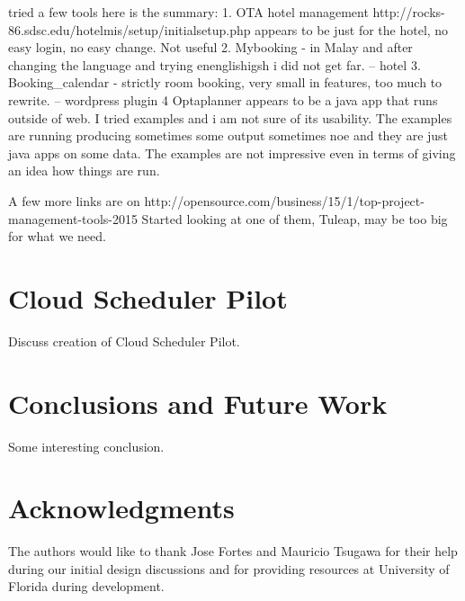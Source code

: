 \documentclass{acm_proc_article-sp}
\begin{document}
		
 tried a few tools  here is the summary:
1. OTA hotel management   http://rocks-86.sdsc.edu/hotelmis/setup/initialsetup.php
    appears to be just for the hotel, no easy login, no easy change. Not useful
2. Mybooking - in Malay and after changing the language and trying enenglishigsh i did not get far. -- hotel
3. Booking\_calendar - strictly room booking, very small in features, too much to rewrite. -- wordpress plugin
4 Optaplanner appears to be a java app that runs outside of web. I tried examples and i am
   not sure of its usability. The examples are running producing sometimes some output sometimes noe
   and they are just java apps on some data. The examples  are not impressive even in terms of giving
   an idea how things are run. 

A few more links are on http://opensource.com/business/15/1/top-project-management-tools-2015
Started looking at  one of them, Tuleap, may be too big for what we need. 


\section{Cloud Scheduler Pilot}
\label{Sec:Pilot}

Discuss creation of Cloud Scheduler Pilot.

\section{Conclusions and Future Work}
\label{Sec:Conclusions}

Some interesting conclusion.

\section{Acknowledgments}

The authors would like to thank Jose Fortes and Mauricio Tsugawa for their help during our initial design discussions and for providing resources at University of Florida during development.


  
\end{document}
